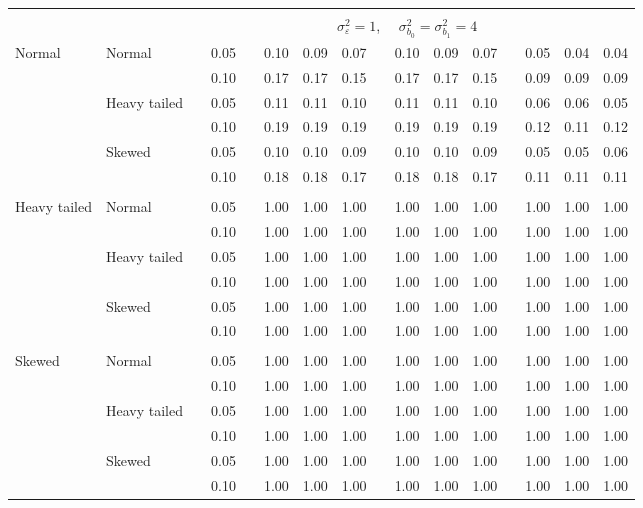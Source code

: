 \begin{table}[ht]
\begin{scriptsize}
\begin{center}
\begin{tabular}{ll p{.1cm} c p{.1cm} rrr p{.1cm} rrr p{.1cm} rrr}
&&&&&&&&&&&&&&&\\
& && && \multicolumn{9}{c}{$\sigma_{\varepsilon}^2 = 1$, \ \ $\sigma_{b_0}^2 = \sigma_{b_1}^2 = 4$} \\ \cline{6-16}

\rowcolor{gray!20} Normal       & Normal       && 0.05 &&  0.10 & 0.09 & 0.07 && 0.10 & 0.09 & 0.07 && 0.05 & 0.04 & 0.04 \\ 
\rowcolor{gray!20}             &              && 0.10 &&  0.17 & 0.17 & 0.15 && 0.17 & 0.17 & 0.15 && 0.09 & 0.09 & 0.09 \\ 
\rowcolor{gray!20}             & Heavy tailed && 0.05 &&  0.11 & 0.11 & 0.10 && 0.11 & 0.11 & 0.10 && 0.06 & 0.06 & 0.05 \\ 
\rowcolor{gray!20}             &              && 0.10 &&  0.19 & 0.19 & 0.19 && 0.19 & 0.19 & 0.19 && 0.12 & 0.11 & 0.12 \\ 
\rowcolor{gray!20}             & Skewed       && 0.05 &&  0.10 & 0.10 & 0.09 && 0.10 & 0.10 & 0.09 && 0.05 & 0.05 & 0.06 \\ 
\rowcolor{gray!20}             &              && 0.10 &&  0.18 & 0.18 & 0.17 && 0.18 & 0.18 & 0.17 && 0.11 & 0.11 & 0.11 \\ 
             &&&&&&&&&&&&&&&\\
Heavy tailed & Normal       && 0.05 &&  1.00 & 1.00 & 1.00 && 1.00 & 1.00 & 1.00 && 1.00 & 1.00 & 1.00 \\ 
             &              && 0.10 &&  1.00 & 1.00 & 1.00 && 1.00 & 1.00 & 1.00 && 1.00 & 1.00 & 1.00 \\ 
             & Heavy tailed && 0.05 &&  1.00 & 1.00 & 1.00 && 1.00 & 1.00 & 1.00 && 1.00 & 1.00 & 1.00 \\ 
             &              && 0.10 &&  1.00 & 1.00 & 1.00 && 1.00 & 1.00 & 1.00 && 1.00 & 1.00 & 1.00 \\ 
             & Skewed       && 0.05 &&  1.00 & 1.00 & 1.00 && 1.00 & 1.00 & 1.00 && 1.00 & 1.00 & 1.00 \\ 
             &              && 0.10 &&  1.00 & 1.00 & 1.00 && 1.00 & 1.00 & 1.00 && 1.00 & 1.00 & 1.00 \\ 
             &&&&&&&&&&&&&&&\\
Skewed       & Normal       && 0.05 &&  1.00 & 1.00 & 1.00 && 1.00 & 1.00 & 1.00 && 1.00 & 1.00 & 1.00 \\ 
             &              && 0.10 &&  1.00 & 1.00 & 1.00 && 1.00 & 1.00 & 1.00 && 1.00 & 1.00 & 1.00 \\ 
             & Heavy tailed && 0.05 &&  1.00 & 1.00 & 1.00 && 1.00 & 1.00 & 1.00 && 1.00 & 1.00 & 1.00 \\ 
             &              && 0.10 &&  1.00 & 1.00 & 1.00 && 1.00 & 1.00 & 1.00 && 1.00 & 1.00 & 1.00 \\ 
             & Skewed       && 0.05 &&  1.00 & 1.00 & 1.00 && 1.00 & 1.00 & 1.00 && 1.00 & 1.00 & 1.00 \\ 
             &              && 0.10 &&  1.00 & 1.00 & 1.00 && 1.00 & 1.00 & 1.00 && 1.00 & 1.00 & 1.00 \\ 



\end{tabular}
\end{center}
\end{scriptsize}
\end{table}
